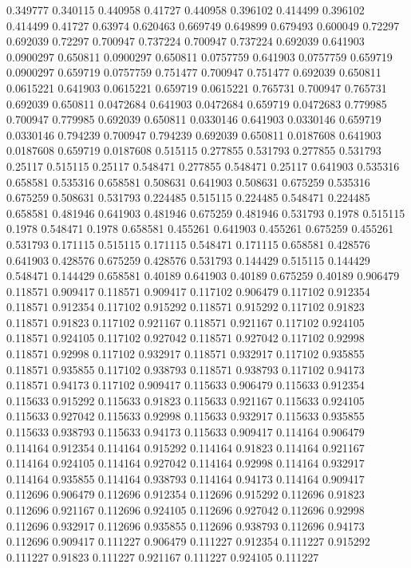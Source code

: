 0.349777 0.340115
0.440958 0.41727
0.440958 0.396102
0.414499 0.396102
0.414499 0.41727
0.63974 0.620463
0.669749 0.649899
0.679493 0.600049
0.72297 0.692039
0.72297 0.700947
0.737224 0.700947
0.737224 0.692039
0.641903 0.0900297
0.650811 0.0900297
0.650811 0.0757759
0.641903 0.0757759
0.659719 0.0900297
0.659719 0.0757759
0.751477 0.700947
0.751477 0.692039
0.650811 0.0615221
0.641903 0.0615221
0.659719 0.0615221
0.765731 0.700947
0.765731 0.692039
0.650811 0.0472684
0.641903 0.0472684
0.659719 0.0472683
0.779985 0.700947
0.779985 0.692039
0.650811 0.0330146
0.641903 0.0330146
0.659719 0.0330146
0.794239 0.700947
0.794239 0.692039
0.650811 0.0187608
0.641903 0.0187608
0.659719 0.0187608
0.515115 0.277855
0.531793 0.277855
0.531793 0.25117
0.515115 0.25117
0.548471 0.277855
0.548471 0.25117
0.641903 0.535316
0.658581 0.535316
0.658581 0.508631
0.641903 0.508631
0.675259 0.535316
0.675259 0.508631
0.531793 0.224485
0.515115 0.224485
0.548471 0.224485
0.658581 0.481946
0.641903 0.481946
0.675259 0.481946
0.531793 0.1978
0.515115 0.1978
0.548471 0.1978
0.658581 0.455261
0.641903 0.455261
0.675259 0.455261
0.531793 0.171115
0.515115 0.171115
0.548471 0.171115
0.658581 0.428576
0.641903 0.428576
0.675259 0.428576
0.531793 0.144429
0.515115 0.144429
0.548471 0.144429
0.658581 0.40189
0.641903 0.40189
0.675259 0.40189
0.906479 0.118571
0.909417 0.118571
0.909417 0.117102
0.906479 0.117102
0.912354 0.118571
0.912354 0.117102
0.915292 0.118571
0.915292 0.117102
0.91823 0.118571
0.91823 0.117102
0.921167 0.118571
0.921167 0.117102
0.924105 0.118571
0.924105 0.117102
0.927042 0.118571
0.927042 0.117102
0.92998 0.118571
0.92998 0.117102
0.932917 0.118571
0.932917 0.117102
0.935855 0.118571
0.935855 0.117102
0.938793 0.118571
0.938793 0.117102
0.94173 0.118571
0.94173 0.117102
0.909417 0.115633
0.906479 0.115633
0.912354 0.115633
0.915292 0.115633
0.91823 0.115633
0.921167 0.115633
0.924105 0.115633
0.927042 0.115633
0.92998 0.115633
0.932917 0.115633
0.935855 0.115633
0.938793 0.115633
0.94173 0.115633
0.909417 0.114164
0.906479 0.114164
0.912354 0.114164
0.915292 0.114164
0.91823 0.114164
0.921167 0.114164
0.924105 0.114164
0.927042 0.114164
0.92998 0.114164
0.932917 0.114164
0.935855 0.114164
0.938793 0.114164
0.94173 0.114164
0.909417 0.112696
0.906479 0.112696
0.912354 0.112696
0.915292 0.112696
0.91823 0.112696
0.921167 0.112696
0.924105 0.112696
0.927042 0.112696
0.92998 0.112696
0.932917 0.112696
0.935855 0.112696
0.938793 0.112696
0.94173 0.112696
0.909417 0.111227
0.906479 0.111227
0.912354 0.111227
0.915292 0.111227
0.91823 0.111227
0.921167 0.111227
0.924105 0.111227
